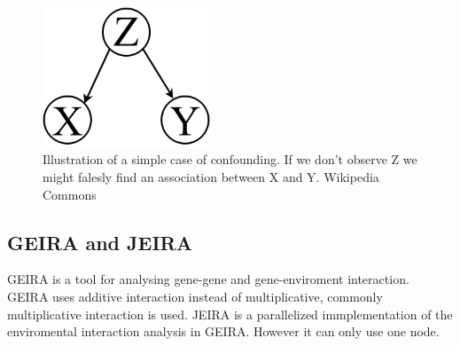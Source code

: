 \documentclass[10pt,a4paper]{article}
\begin{document}
\begin{figure}[h]
    \centering
    \includegraphics[width=5cm]{Simple_Confounding_Case.png}
    \caption{Illustration of a simple case of confounding. If we don't observe Z we might falesly find an association between X and Y. Wikipedia Commons}
    \label{fig:confunding}
\end{figure}

\subsection{GEIRA and JEIRA}
GEIRA is a tool for analysing gene-gene and gene-enviroment interaction. GEIRA uses additive interaction instead of multiplicative, commonly multiplicative interaction is used\cite{geira}. JEIRA is a parallelized immplementation of the enviromental interaction analysis in GEIRA. However it can only use one node.

\clearpage
\end{document}

